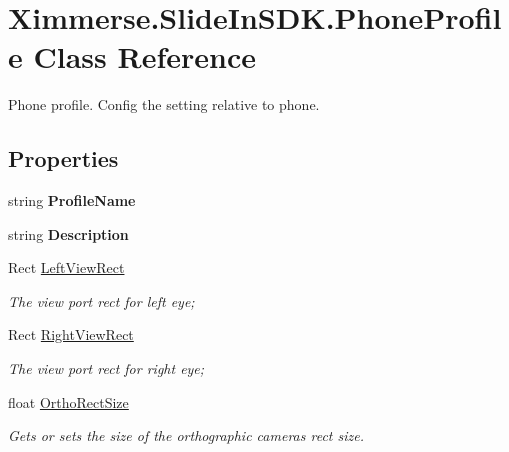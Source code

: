 \hypertarget{class_ximmerse_1_1_slide_in_s_d_k_1_1_phone_profile}{}\section{Ximmerse.\+Slide\+In\+S\+D\+K.\+Phone\+Profile Class Reference}
\label{class_ximmerse_1_1_slide_in_s_d_k_1_1_phone_profile}


Phone profile. Config the setting relative to phone.  


\subsection*{Properties}
\begin{DoxyCompactItemize}
\item 
\mbox{\label{class_ximmerse_1_1_slide_in_s_d_k_1_1_phone_profile_a875c1a7d6833a23dd00c257c5c59c70b}} 
string {\bfseries Profile\+Name}
\item 
\mbox{\label{class_ximmerse_1_1_slide_in_s_d_k_1_1_phone_profile_a08346276207a4f09030f31b8e2dc6f8c}} 
string {\bfseries Description}
\item 
Rect \mbox{\hyperlink{class_ximmerse_1_1_slide_in_s_d_k_1_1_phone_profile_a5f9c374477e3ccd4a4e045fd6dc323da}{Left\+View\+Rect}}
\begin{DoxyCompactList}\small\item\em The view port rect for left eye; \end{DoxyCompactList}\item 
Rect \mbox{\hyperlink{class_ximmerse_1_1_slide_in_s_d_k_1_1_phone_profile_abab72ac8909ed9abcd993f003806d21c}{Right\+View\+Rect}}
\begin{DoxyCompactList}\small\item\em The view port rect for right eye; \end{DoxyCompactList}\item 
float \mbox{\hyperlink{class_ximmerse_1_1_slide_in_s_d_k_1_1_phone_profile_afbe6d85b54837f179acdf19e3e73b3dd}{Ortho\+Rect\+Size}}
\begin{DoxyCompactList}\small\item\em Gets or sets the size of the orthographic camera\textquotesingle{}s rect size. \end{DoxyCompactList}\end{DoxyCompactItemize}


